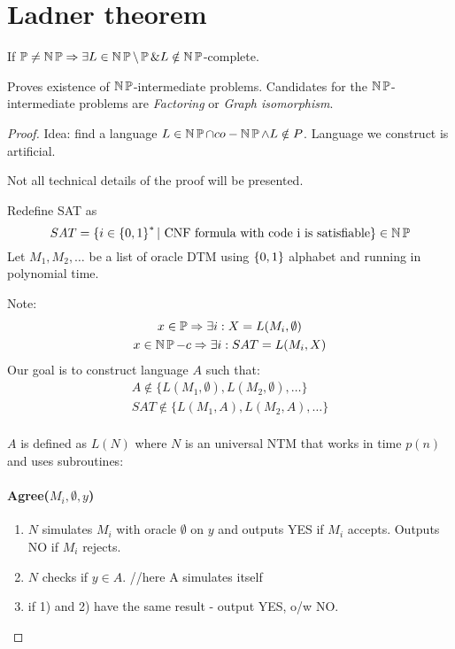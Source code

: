 \section{\texorpdfstring{Ladner theorem}{Ladner theorem}}
\vspace{5mm}
\large

\begin{theorem}[Ladner]
	If $\operatorname{\mathbb{P}} \ne \operatorname{\operatorname{\mathbb{N}}\mathbb{P}} \Rightarrow \exists L \in \operatorname{\operatorname{\mathbb{N}}\mathbb{P}} \setminus \operatorname{\mathbb{P}} \& L \notin \operatorname{\operatorname{\mathbb{N}}\mathbb{P}}$-complete.

	Proves existence of $\operatorname{\operatorname{\mathbb{N}}\mathbb{P}}$-intermediate problems.
	Candidates for the $\operatorname{\operatorname{\mathbb{N}}\mathbb{P}}$-intermediate problems are \emph{Factoring} or \emph{Graph isomorphism}.
\end{theorem}
\begin{proof}
	Idea: find a language $L \in \operatorname{\operatorname{\mathbb{N}}\mathbb{P}} \cap co-\operatorname{\operatorname{\mathbb{N}}\mathbb{P}} \land L \notin P$.
	Language we construct is artificial.

	Not all technical details of the proof will be presented.

	Redefine SAT as
	\[ SAT = \{ i \in \operatorname{\{ 0, 1 \}}^{\ast} |\ \text{CNF formula with code i is satisfiable} \} \in \operatorname{\operatorname{\mathbb{N}}\mathbb{P}} \]
	Let $M_1, M_2, \ldots$ be a list of oracle DTM using $\operatorname{\{ 0, 1 \}}$ alphabet and running in polynomial time.

	Note:
	\begin{gather*}
		x \in \operatorname{\mathbb{P}} \Rightarrow \exists i: X = L(M_i, \emptyset) \\
		x \in \operatorname{\operatorname{\mathbb{N}}\mathbb{P}}-c \Rightarrow \exists i: SAT = L(M_i, X)
	\end{gather*}
	Our goal is to construct language $A$ such that:
	\begin{gather*}
		A \notin \{ L(M_1, \emptyset), L(M_2, \emptyset), \ldots \} \\
		SAT \notin \{ L(M_1, A), L(M_2, A), \ldots \} \\
	\end{gather*}

	$A$ is defined as $L(N)$ where $N$ is an universal NTM that works in time $p(n)$ and uses subroutines:
	\paragraph{Agree($M_i, \emptyset, y$)}
	\begin{enumerate}
		\item $N$ simulates $M_i$ with oracle $\emptyset$ on $y$ and outputs YES if $M_i$ accepts.
			Outputs NO if $M_i$ rejects.
		\item $N$ checks if $y \in A$. //here A simulates itself
		\item if 1) and 2) have the same result - output YES, o/w NO.
	\end{enumerate}


\end{proof}
